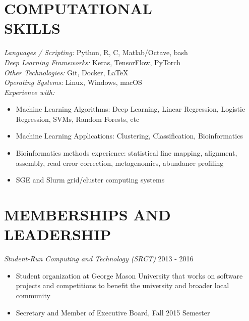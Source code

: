 \documentclass[margin, 10pt]{res} %
\begin{document}
\begin{resume}

\section{COMPUTATIONAL \\ SKILLS} 

{\sl Languages / Scripting:} 
Python, R, C, Matlab/Octave, bash\\
{\sl Deep Learning Frameworks:} Keras, TensorFlow, PyTorch \\
{\sl Other Technologies:} Git, Docker, LaTeX \\
{\sl Operating Systems:} Linux, Windows, macOS \\
{\sl Experience with:} 
\begin{itemize} \itemsep -2pt %
\item Machine Learning Algorithms: Deep Learning, Linear Regression, Logistic Regression, SVMs, Random Forests, etc
\item Machine Learning Applications: Clustering, Classification, Bioinformatics
\item Bioinformatics methods experience: statistical fine mapping, alignment, assembly, read error correction, metagenomics, abundance profiling
\item SGE and Slurm grid/cluster computing systems
\end{itemize}


\section{MEMBERSHIPS AND LEADERSHIP}
{\sl Student-Run Computing and Technology (SRCT)} \hfill 2013 - 2016 \begin{itemize} \itemsep -2pt %
\item Student organization at George Mason University that works on software projects and competitions to benefit the university and broader local community
\item Secretary and Member of Executive Board, Fall 2015 Semester
\end{itemize}


\end{resume}
\end{document}
